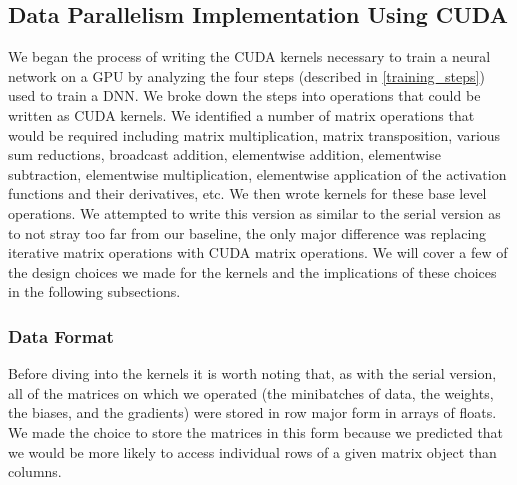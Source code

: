 \documentclass[11pt,a4paper]{article}
\begin{document}
\subsection{Data Parallelism Implementation Using CUDA}
We began the process of writing the CUDA kernels necessary to train a neural network on a GPU by analyzing the four steps (described in \ref{training_steps}) used to train a DNN. We broke down the steps into operations that could be written as CUDA kernels. We identified a number of matrix operations that would be required including matrix multiplication, matrix transposition, various sum reductions, broadcast addition, elementwise addition, elementwise subtraction, elementwise multiplication, elementwise application of the activation functions and their derivatives, etc. We then wrote kernels for these base level operations. We attempted to write this version as similar to the serial version as to not stray too far from our baseline, the only major difference was replacing iterative matrix operations with CUDA matrix operations. We will cover a few of the design choices we made for the kernels and the implications of these choices in the following subsections. 

\subsubsection{Data Format}
Before diving into the kernels it is worth noting that, as with the serial version, all of the matrices on which we operated (the minibatches of data, the weights, the biases, and the gradients) were stored in row major form in arrays of floats. We made the choice to store the matrices in this form because we predicted that we would be more likely to access individual rows of a given matrix object than columns.
\end{document}
